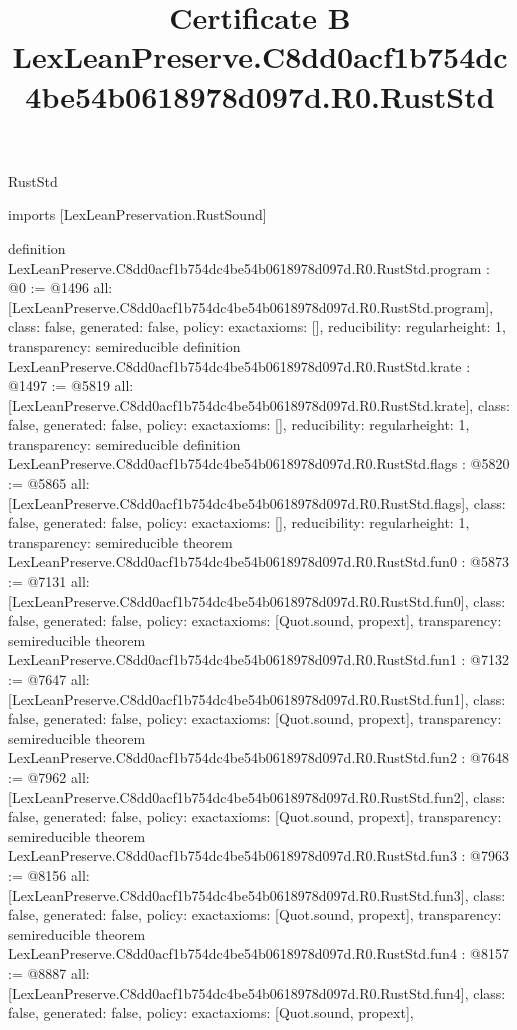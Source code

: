 \begin{lexlean}{RustStd}
\title{Certificate B LexLeanPreserve.C8dd0acf1b754dc4be54b0618978d097d.R0.RustStd}
\begin{coremodule}
imports [LexLeanPreservation.RustSound]

definition LexLeanPreserve.C8dd0acf1b754dc4be54b0618978d097d.R0.RustStd.program : @0 := @1496 {
  all: [LexLeanPreserve.C8dd0acf1b754dc4be54b0618978d097d.R0.RustStd.program],
  class: false,
  generated: false,
  policy: exact{axioms: []},
  reducibility: regular{height: 1},
  transparency: semireducible
}
definition LexLeanPreserve.C8dd0acf1b754dc4be54b0618978d097d.R0.RustStd.krate : @1497 := @5819 {
  all: [LexLeanPreserve.C8dd0acf1b754dc4be54b0618978d097d.R0.RustStd.krate],
  class: false,
  generated: false,
  policy: exact{axioms: []},
  reducibility: regular{height: 1},
  transparency: semireducible
}
definition LexLeanPreserve.C8dd0acf1b754dc4be54b0618978d097d.R0.RustStd.flags : @5820 := @5865 {
  all: [LexLeanPreserve.C8dd0acf1b754dc4be54b0618978d097d.R0.RustStd.flags],
  class: false,
  generated: false,
  policy: exact{axioms: []},
  reducibility: regular{height: 1},
  transparency: semireducible
}
theorem LexLeanPreserve.C8dd0acf1b754dc4be54b0618978d097d.R0.RustStd.fun0 : @5873 := @7131 {
  all: [LexLeanPreserve.C8dd0acf1b754dc4be54b0618978d097d.R0.RustStd.fun0],
  class: false,
  generated: false,
  policy: exact{axioms: [Quot.sound, propext]},
  transparency: semireducible
}
theorem LexLeanPreserve.C8dd0acf1b754dc4be54b0618978d097d.R0.RustStd.fun1 : @7132 := @7647 {
  all: [LexLeanPreserve.C8dd0acf1b754dc4be54b0618978d097d.R0.RustStd.fun1],
  class: false,
  generated: false,
  policy: exact{axioms: [Quot.sound, propext]},
  transparency: semireducible
}
theorem LexLeanPreserve.C8dd0acf1b754dc4be54b0618978d097d.R0.RustStd.fun2 : @7648 := @7962 {
  all: [LexLeanPreserve.C8dd0acf1b754dc4be54b0618978d097d.R0.RustStd.fun2],
  class: false,
  generated: false,
  policy: exact{axioms: [Quot.sound, propext]},
  transparency: semireducible
}
theorem LexLeanPreserve.C8dd0acf1b754dc4be54b0618978d097d.R0.RustStd.fun3 : @7963 := @8156 {
  all: [LexLeanPreserve.C8dd0acf1b754dc4be54b0618978d097d.R0.RustStd.fun3],
  class: false,
  generated: false,
  policy: exact{axioms: [Quot.sound, propext]},
  transparency: semireducible
}
theorem LexLeanPreserve.C8dd0acf1b754dc4be54b0618978d097d.R0.RustStd.fun4 : @8157 := @8887 {
  all: [LexLeanPreserve.C8dd0acf1b754dc4be54b0618978d097d.R0.RustStd.fun4],
  class: false,
  generated: false,
  policy: exact{axioms: [Quot.sound, propext]},
}
\end{coremodule}
\end{lexlean}
